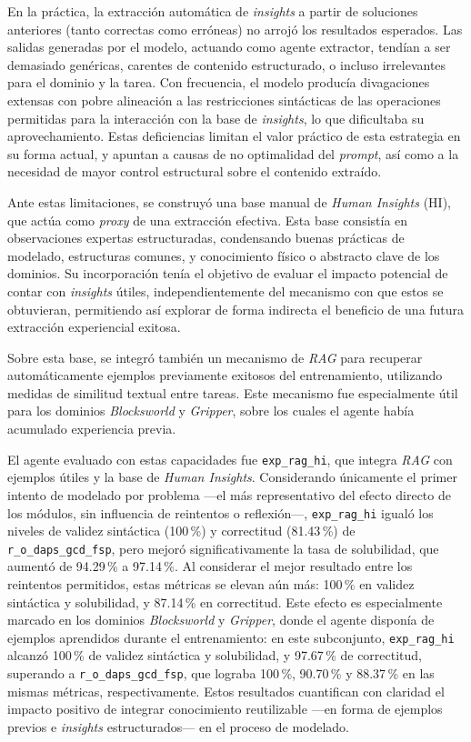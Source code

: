 En la práctica, la extracción automática de \textit{insights} a partir de soluciones anteriores (tanto correctas como erróneas) no arrojó los resultados esperados. Las salidas generadas por el modelo, actuando como agente extractor, tendían a ser demasiado genéricas, carentes de contenido estructurado, o incluso irrelevantes para el dominio y la tarea. Con frecuencia, el modelo producía divagaciones extensas con pobre alineación a las restricciones sintácticas de las operaciones permitidas para la interacción con la base de \textit{insights}, lo que dificultaba su aprovechamiento. Estas deficiencias limitan el valor práctico de esta estrategia en su forma actual, y apuntan a causas de no optimalidad del \textit{prompt}, así como a la necesidad de mayor control estructural sobre el contenido extraído.

Ante estas limitaciones, se construyó una base manual de \textit{Human Insights} (HI), que actúa como \textit{proxy} de una extracción efectiva. Esta base consistía en observaciones expertas estructuradas, condensando buenas prácticas de modelado, estructuras comunes, y conocimiento físico o abstracto clave de los dominios. Su incorporación tenía el objetivo de evaluar el impacto potencial de contar con \textit{insights} útiles, independientemente del mecanismo con que estos se obtuvieran, permitiendo así explorar de forma indirecta el beneficio de una futura extracción experiencial exitosa.

Sobre esta base, se integró también un mecanismo de \textit{RAG} para recuperar automáticamente ejemplos previamente exitosos del entrenamiento, utilizando medidas de similitud textual entre tareas. Este mecanismo fue especialmente útil para los dominios \textit{Blocksworld} y \textit{Gripper}, sobre los cuales el agente había acumulado experiencia previa.

El agente evaluado con estas capacidades fue \texttt{exp\_rag\_hi}, que integra \textit{RAG} con ejemplos útiles y la base de \textit{Human Insights}. Considerando únicamente el primer intento de modelado por problema —el más representativo del efecto directo de los módulos, sin influencia de reintentos o reflexión—, \texttt{exp\_rag\_hi} igualó los niveles de validez sintáctica (100\,\%) y correctitud (81.43\,\%) de \texttt{r\_o\_daps\_gcd\_fsp}, pero mejoró significativamente la tasa de solubilidad, que aumentó de 94.29\,\% a 97.14\,\%. Al considerar el mejor resultado entre los reintentos permitidos, estas métricas se elevan aún más: 100\,\% en validez sintáctica y solubilidad, y 87.14\,\% en correctitud. Este efecto es especialmente marcado en los dominios \textit{Blocksworld} y \textit{Gripper}, donde el agente disponía de ejemplos aprendidos durante el entrenamiento: en este subconjunto, \texttt{exp\_rag\_hi} alcanzó 100\,\% de validez sintáctica y solubilidad, y 97.67\,\% de correctitud, superando a \texttt{r\_o\_daps\_gcd\_fsp}, que lograba 100\,\%, 90.70\,\% y 88.37\,\% en las mismas métricas, respectivamente. Estos resultados cuantifican con claridad el impacto positivo de integrar conocimiento reutilizable —en forma de ejemplos previos e \textit{insights} estructurados— en el proceso de modelado.

